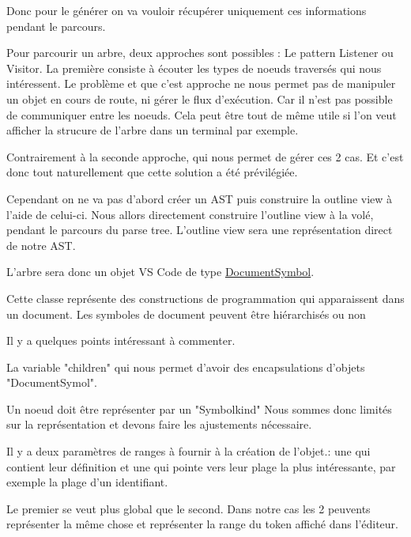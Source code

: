 \documentclass[
    iict, %
    il, %
]{heig-tb}
\begin{document}
Donc pour le générer on va vouloir récupérer uniquement ces informations pendant le parcours.

Pour parcourir un arbre, deux approches sont possibles : Le pattern Listener ou Visitor.
La première consiste à écouter les types de noeuds traversés qui nous intéressent. Le problème et que c'est approche ne nous permet pas de manipuler un objet en cours de route, ni gérer le flux d'exécution.
Car il n'est pas possible de communiquer entre les noeuds. Cela peut être tout de même utile si l'on veut afficher la strucure de l'arbre dans un terminal par exemple.

Contrairement à la seconde approche, qui nous permet de gérer ces 2 cas. Et c'est donc tout naturellement que cette solution a été prévilégiée.

Cependant on ne va pas d'abord créer un AST puis construire la outline view à l'aide de celui-ci.
Nous allors directement construire l'outline view à la volé, pendant le parcours du parse tree. L'outline view sera une représentation direct de notre AST.

L'arbre sera donc un objet VS Code de type \href{https://code.visualstudio.com/api/references/vscode-api#DocumentSymbol}{DocumentSymbol}.

Cette classe représente des constructions de programmation qui apparaissent dans un document.
Les symboles de document peuvent être hiérarchisés ou non

Il y a quelques points intéressant à commenter.

La variable "children" qui nous permet d'avoir des encapsulations d'objets "DocumentSymol".

Un noeud doit être représenter par un "Symbolkind" %
Nous sommes donc limités sur la représentation et devons faire les ajustements nécessaire.

Il y a deux paramètres de ranges à fournir à la création de l'objet.: une qui contient leur définition et une qui pointe vers leur plage la plus intéressante, par exemple la plage d'un identifiant.

Le premier se veut plus global que le second.
Dans notre cas les 2 peuvents représenter la même chose et représenter la range du token affiché dans l'éditeur.


\end{document}
